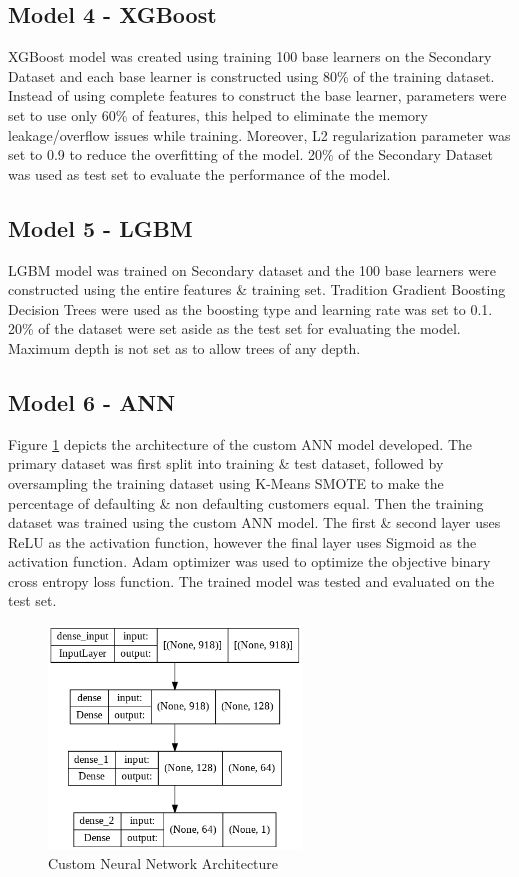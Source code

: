 \documentclass[twoside,11pt,a4paper]{article}
\begin{document}
\subsection{Model 4 - \acf{XGBoost}}
\acs{XGBoost} model was created using training 100 base learners on the Secondary Dataset and each base learner is constructed using 80\% of the training dataset. Instead of using complete features to construct the base learner, parameters were set to use only 60\% of features, this helped to eliminate the memory leakage/overflow issues while training. Moreover, L2 regularization parameter was set to 0.9 to reduce the overfitting of the model. 20\% of the Secondary Dataset was used as test set to evaluate the performance of the model.

\subsection{Model 5 - \acf{LGBM}}
\acs{LGBM} model was trained on Secondary dataset and the 100 base learners were constructed using the entire features \& training set. Tradition Gradient Boosting Decision Trees were used as the boosting type and learning rate was set to 0.1. 20\% of the dataset were set aside as the test set for evaluating the model. Maximum depth is not set as to allow trees of any depth. 

\subsection{Model 6 - \acf{ANN}}
Figure \ref{fig:nn_arch} depicts the architecture of the custom \acs{ANN} model developed.  The primary dataset was first split into training \& test dataset, followed by oversampling the training dataset using K-Means \acs{SMOTE} to make the percentage of defaulting \& non defaulting customers equal. Then the training dataset was trained using the custom \acs{ANN} model. The first \& second layer uses \acf{ReLU} as the activation function, however the final layer uses Sigmoid as the activation function. Adam optimizer was used to optimize the objective binary cross entropy loss function. The trained model was tested and evaluated on the test set.\\
\begin{figure}[ht]
	\centering
	\includegraphics[width=0.6\textwidth, height=0.3\textheight]{nn_arch}
	\caption[Custom Neural Network Architecture]{Custom Neural Network Architecture}
	\label{fig:nn_arch}
\end{figure}
\FloatBarrier
\end{document}
